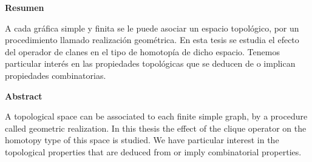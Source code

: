 \thispagestyle{empty}
\begin{flushleft}
  {\bfseries\Large Resumen}
\end{flushleft}

A cada gráfica simple y finita se le puede asociar un espacio topológico, por un procedimiento llamado realización geométrica. En esta tesis se estudia el efecto del operador de clanes en el tipo de homotopía de dicho espacio. Tenemos particular interés en las propiedades topológicas que se deducen de o implican propiedades combinatorias.

\vspace{2cm}

\begin{flushleft}
  {\bfseries\Large Abstract}
\end{flushleft}

A topological space can be associated to each finite simple graph, by
a procedure called geometric realization. In this thesis the effect of
the clique operator on the homotopy type of this space is studied. We have particular interest in the topological properties that are deduced from or imply combinatorial properties.



 \newpage \thispagestyle{empty}

